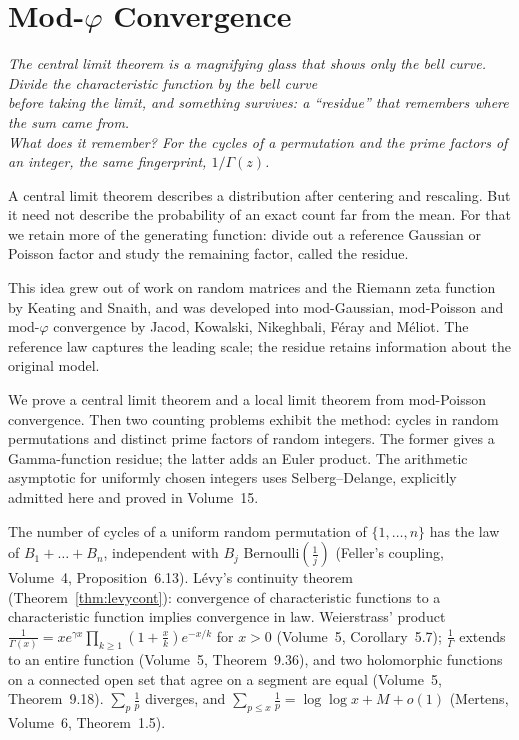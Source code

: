 \chapter{Mod-\texorpdfstring{$\varphi$}{phi} Convergence}
\begin{center}\itshape
The central limit theorem is a magnifying glass that shows only the bell curve. Divide the characteristic function by the bell curve\\
before taking the limit, and something survives: a ``residue'' that remembers where the sum came from.\\
What does it remember? For the cycles of a permutation and the prime factors of an integer, the same fingerprint, $1/\Gamma(z)$.
\end{center}

A central limit theorem describes a distribution after centering and rescaling. But it need not describe the probability of an exact count far from the mean. For that we retain more of the generating function: divide out a reference Gaussian or Poisson factor and study the remaining factor, called the residue.

This idea grew out of work on random matrices and the Riemann zeta function by Keating and Snaith, and was developed into mod-Gaussian, mod-Poisson and mod-$\varphi$ convergence by Jacod, Kowalski, Nikeghbali, F\'eray and M\'eliot. The reference law captures the leading scale; the residue retains information about the original model.

We prove a central limit theorem and a local limit theorem from mod-Poisson convergence. Then two counting problems exhibit the method: cycles in random permutations and distinct prime factors of random integers. The former gives a Gamma-function residue; the latter adds an Euler product. The arithmetic asymptotic for uniformly chosen integers uses Selberg--Delange, explicitly admitted here and proved in Volume~15.

\begin{reminder}
The number of cycles of a uniform random permutation of $\{1,\dots,n\}$ has the law of $B_1+\dots+B_n$, independent with $B_j$ Bernoulli$(\frac1j)$ (Feller's coupling, Volume~4, Proposition~6.13). L\'evy's continuity theorem (Theorem~\ref{thm:levycont}):
convergence of characteristic functions to a characteristic function implies convergence in law. Weierstrass' product $\frac1{\Gamma(x)}=xe^{\gamma x}\prod_{k\ge1}(1+\frac xk)e^{-x/k}$ for $x>0$ (Volume~5, Corollary~5.7); $\frac1\Gamma$ extends to an entire function
(Volume~5, Theorem~9.36), and two holomorphic functions on a connected open set that agree on a segment are equal (Volume~5, Theorem~9.18). $\sum_p\frac1p$ diverges, and $\sum_{p\le x}\frac1p=\log\log x+M+o(1)$ (Mertens, Volume~6, Theorem~1.5).
\end{reminder}

